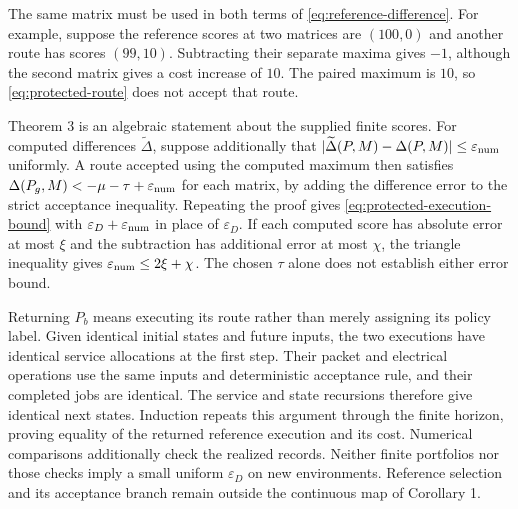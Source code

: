 The same matrix must be used in both terms of
\eqref{eq:reference-difference}.  For example, suppose the reference
scores at two matrices are $(100,0)$ and another route has scores
$(99,10)$.  Subtracting their separate maxima gives $-1$, although the
second matrix gives a cost increase of $10$.  The paired maximum is
$10$, so \eqref{eq:protected-route} does not accept that route.

Theorem 3 is an algebraic statement about the supplied finite scores.
For computed differences $\widetilde\Delta$, suppose additionally that
$|\widetilde\Delta(P,M)-\Delta(P,M)|\le\varepsilon_{\rm num}$ uniformly.
A route accepted using the computed maximum then satisfies
$\Delta(P_g,M)<-\mu-\tau+\varepsilon_{\rm num}$ for each matrix, by adding
the difference error to the strict acceptance inequality.  Repeating the
proof gives \eqref{eq:protected-execution-bound} with
$\varepsilon_D+\varepsilon_{\rm num}$ in place of $\varepsilon_D$.
If each computed score has absolute error at most $\xi$ and the subtraction
has additional error at most $\chi$, the triangle inequality gives
$\varepsilon_{\rm num}\le2\xi+\chi$.  The chosen $\tau$ alone does not
establish either error bound.

Returning $P_b$ means executing its route rather than merely assigning its
policy label.  Given identical initial states and future inputs, the two
executions have identical service allocations at the first step.  Their
packet and electrical operations use the same inputs and deterministic
acceptance rule, and their completed jobs are identical.  The service and
state recursions therefore give identical next states.  Induction repeats
this argument through the finite horizon, proving equality of the returned
reference execution and its cost.  Numerical comparisons additionally check
the realized records.  Neither finite portfolios nor those checks imply a
small uniform $\varepsilon_D$ on new environments.  Reference selection and
its acceptance branch remain outside the continuous map of Corollary 1.
